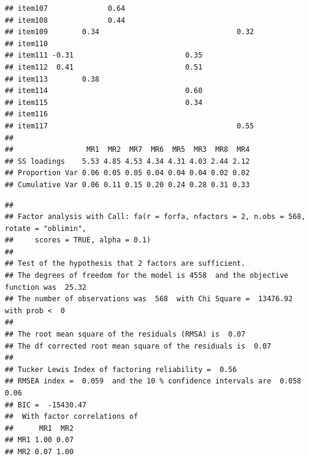 \documentclass[
  english,
  man]{apa6}
\begin{document}
\begin{verbatim}
## item107              0.64                              
## item108              0.44                              
## item109        0.34                                0.32
## item110                                                
## item111 -0.31                          0.35            
## item112  0.41                          0.51            
## item113        0.38                                    
## item114                                0.60            
## item115                                0.34            
## item116                                                
## item117                                            0.55
## 
##                 MR1  MR2  MR7  MR6  MR5  MR3  MR8  MR4
## SS loadings    5.53 4.85 4.53 4.34 4.31 4.03 2.44 2.12
## Proportion Var 0.06 0.05 0.05 0.04 0.04 0.04 0.02 0.02
## Cumulative Var 0.06 0.11 0.15 0.20 0.24 0.28 0.31 0.33
\end{verbatim}

\begin{verbatim}
## 
## Factor analysis with Call: fa(r = forfa, nfactors = 2, n.obs = 568, rotate = "oblimin", 
##     scores = TRUE, alpha = 0.1)
## 
## Test of the hypothesis that 2 factors are sufficient.
## The degrees of freedom for the model is 4558  and the objective function was  25.32 
## The number of observations was  568  with Chi Square =  13476.92  with prob <  0 
## 
## The root mean square of the residuals (RMSA) is  0.07 
## The df corrected root mean square of the residuals is  0.07 
## 
## Tucker Lewis Index of factoring reliability =  0.56
## RMSEA index =  0.059  and the 10 % confidence intervals are  0.058 0.06
## BIC =  -15430.47
##  With factor correlations of 
##      MR1  MR2
## MR1 1.00 0.07
## MR2 0.07 1.00
\end{verbatim}
\end{document}
